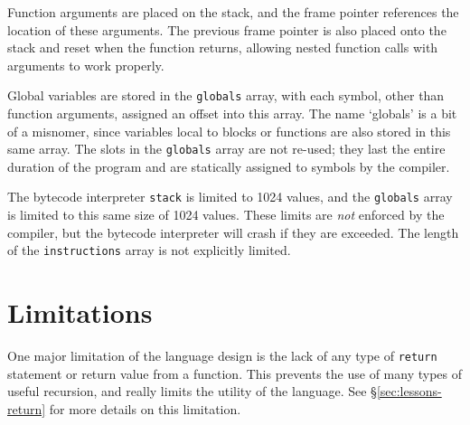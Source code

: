 Function arguments are placed on the stack, and the frame pointer references the location of these arguments.  The previous frame pointer is also placed onto the stack and reset when the function returns, allowing nested function calls with arguments to work properly.

Global variables are stored in the \texttt{globals} array, with each symbol, other than function arguments, assigned an offset into this array.  The name `globals' is a bit of a misnomer, since variables local to blocks or functions are also stored in this same array.  The slots in the \texttt{globals} array are not re-used; they last the entire duration of the program and are statically assigned to symbols by the compiler.

The bytecode interpreter \texttt{stack} is limited to 1024 values, and the \texttt{globals} array is limited to this same size of 1024 values.  These limits are \emph{not} enforced by the compiler, but the bytecode interpreter will crash if they are exceeded.  The length of the \texttt{instructions} array is not explicitly limited.

\section{Limitations}
One major limitation of the language design is the lack of any type of \texttt{return} statement or return value from a function.  This prevents the use of many types of useful recursion, and really limits the utility of the language.  See \S\ref{sec:lessons-return} for more details on this limitation.